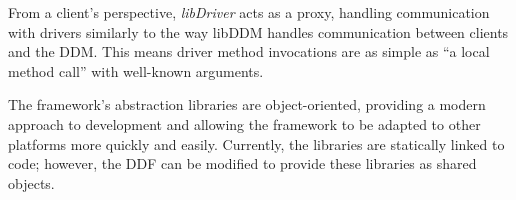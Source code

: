 From a client's perspective, {\em libDriver} acts as a proxy, handling
communication with drivers similarly to the way libDDM handles
communication between clients and the DDM.  This means driver method
invocations are as simple as ``a local method call'' with well-known
arguments.

The framework's abstraction libraries are object-oriented, providing a modern
approach to development and allowing the framework to be adapted to other
platforms more quickly and easily.  Currently, the libraries are statically
linked to code; however, the DDF can be modified to provide these libraries
as shared objects.

